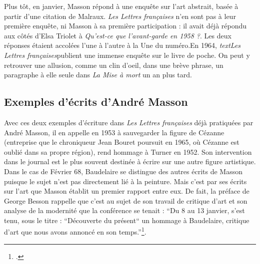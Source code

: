 	Plus tôt, en janvier, Masson répond à une enquête sur l’art abstrait, basée à partir d’une citation de Malraux. \emph{Les Lettres françaises} n’en sont pas à leur première enquête, ni Masson à sa première participation : il avait déjà répondu aux côtés d’Elsa Triolet à \emph{Qu’est-ce que l’avant-garde en 1958 ?}. Les deux réponses étaient accolées l'une à l'autre à la Une du numéro.En 1964, \emph{textLes Lettres françaises}publient une immense enquête sur le livre de poche. On peut y retrouver une allusion, comme un clin d’oeil, dans une brève phrase, un paragraphe à elle seule dans \emph{La Mise à mort} un an plus tard.

\subsection{ Exemples d'écrits d'André Masson}

Avec ces deux exemples d’écriture dans \emph{Les Lettres françaises} déjà pratiquées par André Masson, il en appelle en 1953 à sauvegarder la figure de Cézanne (entreprise que le chroniqueur Jean Bouret poursuit en 1965, où Cézanne est oublié dans sa propre région), rend hommage à Turner en 1952. Son intervention dans le journal est le plus souvent destinée à écrire sur une autre figure artistique. Dans le cas de Février 68, Baudelaire se distingue des autres écrits de Masson puisque le sujet n'est pas directement lié à la peinture. Mais c’est par ses écrits sur l’art que Masson établit un premier rapport entre eux. De fait, la préface de George Besson rappelle que c’est au sujet de son travail de critique d’art et son analyse de la modernité que la conférence se tenait : \enquote{Du 8 au 13 janvier, s’est tenu, sous le titre :  “Découverte du présent“ un hommage à Baudelaire, critique d’art que nous avons annoncé en son temps.}\footcite{baudelairepeintres}.



